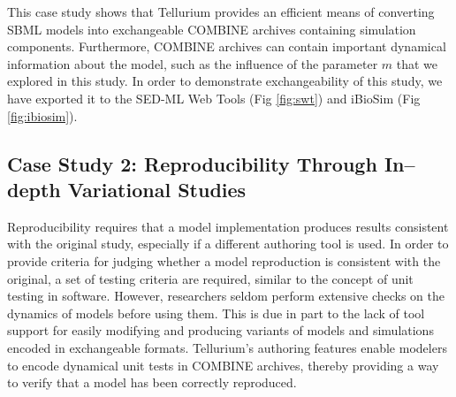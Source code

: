 \documentclass[10pt,letterpaper]{article}
\begin{document}
This case study shows that Tellurium provides an efficient means of converting SBML models into exchangeable COMBINE archives containing simulation components. Furthermore, COMBINE archives can contain important dynamical information about the model, such as the influence of the parameter $m$ that we explored in this study. In order to demonstrate exchangeability of this study, we have exported it to the SED-ML Web Tools \cite{bergmann2017sed} (Fig \ref{fig:swt}) and iBioSim \cite{myers2009ibiosim} (Fig \ref{fig:ibiosim}).

\subsection*{Case Study 2: Reproducibility Through In--depth Variational Studies}

Reproducibility requires that a model implementation produces results consistent with the original study, especially if a different authoring tool is used. In order to provide criteria for judging whether a model reproduction is consistent with the original, a set of testing criteria are required, similar to the concept of unit testing in software.
However, researchers seldom perform extensive checks on the dynamics of models before using them. This is due in part to the lack of tool support for easily modifying and producing variants of models and simulations encoded in exchangeable formats.
Tellurium's authoring features enable modelers to encode dynamical unit tests in COMBINE archives, thereby providing a way to verify that a model has been correctly reproduced.
\end{document}
